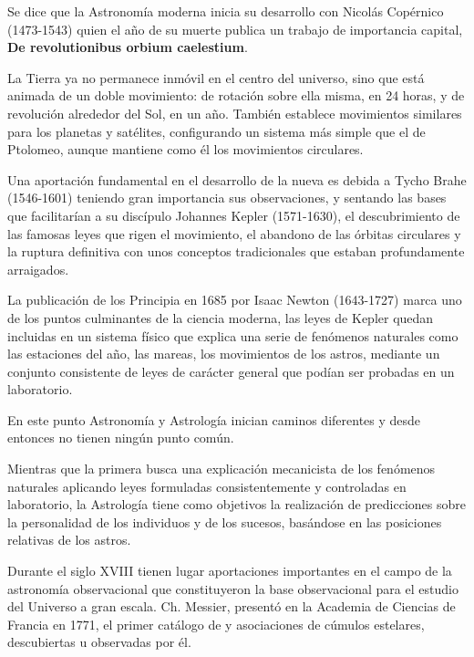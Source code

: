 \bigskip
Se dice que la Astronomía moderna\cite{AstMod} inicia su desarrollo con Nicolás Copérnico (1473-1543)  quien el año de su muerte publica un trabajo de importancia capital, \textbf{De revolutionibus orbium caelestium}\cite{Copernico}.

\bigskip
 La Tierra ya no permanece inmóvil en el centro del universo, sino que está animada de un doble movimiento: de rotación sobre ella misma, en 24 horas, y de revolución alrededor del Sol, en un año. También establece movimientos similares para los planetas y satélites, configurando un sistema más simple que el de Ptolomeo, aunque mantiene como él los movimientos circulares.

\bigskip
Una aportación fundamental en el desarrollo de la nueva es debida a Tycho Brahe (1546-1601)\cite{Tycho} teniendo gran importancia sus observaciones, y  sentando las bases que facilitarían a su discípulo Johannes Kepler (1571-1630)\cite{Kepler}, el descubrimiento de las famosas leyes que rigen el movimiento, el abandono de las órbitas circulares y la ruptura definitiva con unos conceptos tradicionales que estaban profundamente arraigados. 

\bigskip
La publicación de los Principia en 1685 por Isaac Newton (1643-1727)\cite{Newton} marca uno de los puntos culminantes de la ciencia moderna, las leyes de Kepler quedan incluidas en un sistema físico que explica una serie de fenómenos naturales como las estaciones del año, las mareas, los movimientos de los astros, mediante un conjunto consistente de leyes de carácter general que podían ser probadas en un laboratorio.

\bigskip
En este punto Astronomía y Astrología inician caminos diferentes y desde entonces no tienen ningún punto común.

\bigskip
Mientras que la primera busca una explicación mecanicista de los fenómenos naturales aplicando leyes formuladas consistentemente y controladas en laboratorio, la Astrología tiene como objetivos la realización de predicciones sobre la personalidad de los individuos y de los sucesos, basándose en las posiciones relativas de los astros.\cite{astrologia}

\bigskip
Durante el siglo XVIII tienen lugar aportaciones importantes en el campo de la astronomía observacional que constituyeron la base observacional para el estudio del Universo a gran escala. Ch. Messier, presentó en la Academia de Ciencias de Francia en 1771, el primer catálogo de y asociaciones de cúmulos estelares, descubiertas u observadas por él\cite{messier}.

